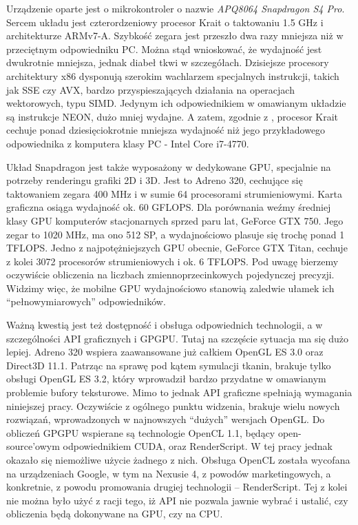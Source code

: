 		Urządzenie oparte jest o mikrokontroler o nazwie \emph{APQ8064 Snapdragon S4 Pro}. Sercem układu jest czterordzeniowy procesor Krait o taktowaniu 1.5 GHz i architekturze ARMv7-A. Szybkość zegara jest przeszło dwa razy mniejsza niż w przeciętnym odpowiedniku PC. Można stąd wnioskować, że wydajność jest dwukrotnie mniejsza, jednak diabeł tkwi w szczegółach. Dzisiejsze procesory architektury x86 dysponują szerokim wachlarzem specjalnych instrukcji, takich jak SSE czy AVX, bardzo przyspieszających działania na operacjach wektorowych, typu SIMD. Jedynym ich odpowiednikiem w omawianym układzie są instrukcje NEON, dużo mniej wydajne. A zatem, zgodnie z \cite{versus}, procesor Krait cechuje ponad dziesięciokrotnie mniejsza wydajność niż jego przykładowego odpowiednika z komputera klasy PC - Intel Core i7-4770.
		
		Układ Snapdragon jest także wyposażony w dedykowane GPU, specjalnie na potrzeby renderingu grafiki 2D i 3D. Jest to Adreno 320, cechujące się taktowaniem zegara 400 MHz i w sumie 64 procesorami strumieniowymi. Karta graficzna osiąga wydajność ok. 60 GFLOPS. Dla porównania weźmy średniej klasy GPU komputerów stacjonarnych sprzed paru lat, GeForce GTX 750. Jego zegar to 1020 MHz, ma ono 512 SP, a wydajnościowo plasuje się trochę ponad 1 TFLOPS. Jedno z najpotężniejszych GPU obecnie, GeForce GTX Titan, cechuje z kolei 3072 procesorów strumieniowych i ok. 6 TFLOPS. Pod uwagę bierzemy oczywiście obliczenia na liczbach zmiennoprzecinkowych pojedynczej precyzji. Widzimy więc, że mobilne GPU wydajnościowo stanowią zaledwie ułamek ich ``pełnowymiarowych'' odpowiedników.
		
		Ważną kwestią jest też dostępność i obsługa odpowiednich technologii, a w szczególności API graficznych i GPGPU. Tutaj na szczęście sytuacja ma się dużo lepiej. Adreno 320 wspiera zaawansowane już całkiem OpenGL ES 3.0 oraz Direct3D 11.1. Patrząc na sprawę pod kątem symulacji tkanin, brakuje tylko obsługi OpenGL ES 3.2, który wprowadził bardzo przydatne w omawianym problemie bufory teksturowe. Mimo to jednak API graficzne spełniają wymagania niniejszej pracy. Oczywiście z ogólnego punktu widzenia, brakuje wielu nowych rozwiązań, wprowadzonych w najnowszych ``dużych'' wersjach OpenGL. Do obliczeń GPGPU wspierane są technologie OpenCL 1.1, będący open-source'owym odpowiednikiem CUDA, oraz RenderScript. W tej pracy jednak okazało się niemożliwe użycie żadnego z nich. Obsługa OpenCL została wycofana na urządzeniach Google, w tym na Nexusie 4, z powodów marketingowych, a konkretnie, z powodu promowania drugiej technologii -- RenderScript. Tej z kolei nie można było użyć z racji tego, iż API nie pozwala jawnie wybrać i ustalić, czy obliczenia będą dokonywane na GPU, czy na CPU.
		
